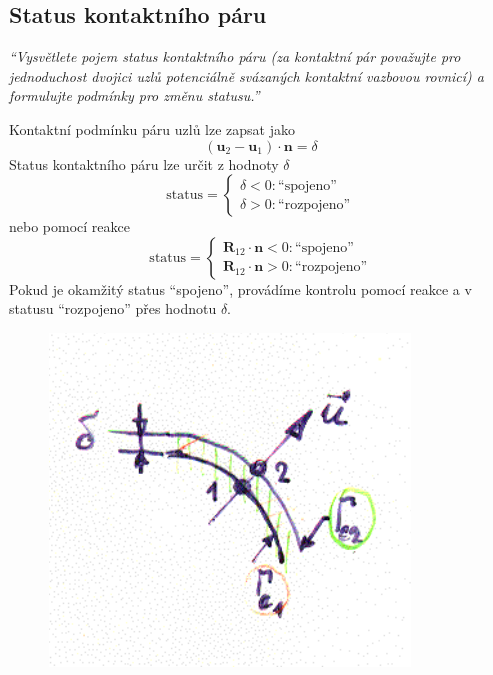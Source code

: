 \documentclass{article}
\begin{document}
\begin{multicols}{2}
	\section{Status kontaktního páru}
	\emph{``Vysvětlete pojem status kontaktního páru (za kontaktní pár považujte pro jednoduchost dvojici uzlů potenciálně svázaných kontaktní vazbovou rovnicí) a formulujte podmínky pro změnu statusu.''}

	Kontaktní podmínku páru uzlů lze zapsat jako
	\begin{equation*}
		(\bm{u}_2 - \bm{u}_1 ) \cdot \bm{n} = \delta
	\end{equation*}
	Status kontaktního páru lze určit z hodnoty $\delta$
	\begin{equation*}
		\text{status} = \left\{
		    \begin{array}{ll}
		    	\delta < 0 : \text{``spojeno''} \\
		    	\delta > 0 : \text{``rozpojeno''}
		    \end{array}
		    \right.
	\end{equation*}
	nebo pomocí reakce
	\begin{equation*}
		\text{status} = \left\{
		    \begin{array}{ll}
		    	\bm{R}_{12} \cdot \bm{n} < 0 : \text{``spojeno''} \\
		    	\bm{R}_{12} \cdot \bm{n} > 0 : \text{``rozpojeno''}
		    \end{array}
		    \right.
	\end{equation*}
	Pokud je okamžitý status ``spojeno'', provádíme kontrolu pomocí reakce a v statusu ``rozpojeno'' přes hodnotu $\delta$.
	\begin{figure}[H]
		\centering
		\includegraphics[width=.8\linewidth]{figs/KontaktniPar.png}
	\end{figure}
	

\end{multicols}
\end{document}
